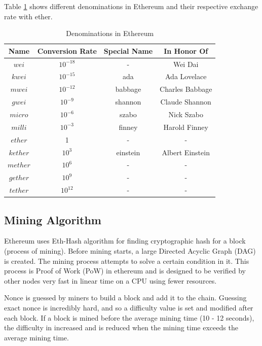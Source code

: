 \documentclass[11pt,openright]{report}
\begin{document}
Table \ref{eth_denominations} shows different denominations in Ethereum and their respective exchange rate with ether.
\begin{table}[!htbp]
	\renewcommand{\arraystretch}{1.3}
	\caption{Denominations in Ethereum}
	\label{eth_denominations}
	\centering
	\begin{tabular}{|c||c|c|c|}
		\hline
		\bfseries Name & \bfseries Conversion Rate & \bfseries Special Name & \bfseries In Honor Of\\
		\hline\hline
		$wei$ & $10^{-18}$ & - & Wei Dai \\ \hline
	    $kwei$ & $10^{-15}$ & ada & Ada Lovelace \\ \hline
	    $mwei$ & $10^{-12}$ & babbage & Charles Babbage \\ \hline
	    $gwei$ & $10^{-9}$ & shannon & Claude Shannon \\ \hline
	    $micro$ & $10^{-6}$ & szabo & Nick Szabo \\ \hline
	    $milli$ & $10^{-3}$ & finney & Harold Finney \\ \hline
	    $ether$ & 1 & - & - \\ \hline
	    $kether$ & $10^{3}$ & einstein & Albert Einstein \\ \hline
	    $mether$ & $10^{6}$ & - & - \\ \hline
	    $gether$ & $10^{9}$ & - & - \\ \hline
	    $tether$ & $10^{12}$ & - & - \\ \hline
	\end{tabular}
\end{table}
\subsection{Mining Algorithm}
Ethereum uses Eth-Hash algorithm \cite{wood2014yellow} for finding cryptographic hash for a block (process of mining). Before mining starts, a large Directed Acyclic Graph (DAG) is created. The mining process attempts to solve a certain condition in it. This process is Proof of Work (PoW) in ethereum and is designed to be verified by other nodes very fast in linear time on a CPU using fewer resources.

Nonce is guessed by miners to build a block and add it to the chain. Guessing exact nonce is incredibly hard, and so a difficulty value is set and modified after each block. If a block is mined before the average mining time (10 - 12 seconds), the difficulty in increased and is reduced when the mining time exceeds the average mining time.
\end{document}

